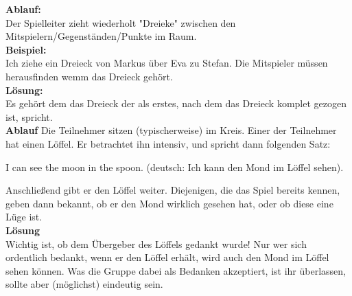 \newpage


    \textbf{Ablauf:}\\  Der Spielleiter zieht wiederholt "Dreieke" zwischen den Mitspielern/Gegenständen/Punkte im Raum.\\
    \textbf{Beispiel:}\\ Ich ziehe ein Dreieck von Markus über Eva zu Stefan. Die Mitspieler müssen herausfinden wemm das Dreieck gehört.\\
    \textbf{Lösung:}\\ Es gehört dem das Dreieck der als erstes, nach dem das Dreieck komplet gezogen ist, spricht.\\



\textbf{Ablauf}
 Die Teilnehmer sitzen (typischerweise) im Kreis. Einer der Teilnehmer hat einen Löffel. Er betrachtet ihn intensiv, und spricht dann folgenden Satz:

I can see the moon in the spoon. (deutsch: Ich kann den Mond im Löffel sehen).

Anschließend gibt er den Löffel weiter. Diejenigen, die das Spiel bereits kennen, geben dann bekannt, ob er den Mond wirklich gesehen hat, oder ob diese eine Lüge ist. \\
\textbf{Lösung}\\
Wichtig ist, ob dem Übergeber des Löffels gedankt wurde! Nur wer sich ordentlich bedankt, wenn er den Löffel erhält, wird auch den Mond im Löffel sehen können. Was die Gruppe dabei als Bedanken akzeptiert, ist ihr überlassen, sollte aber (möglichst) eindeutig sein.\\




